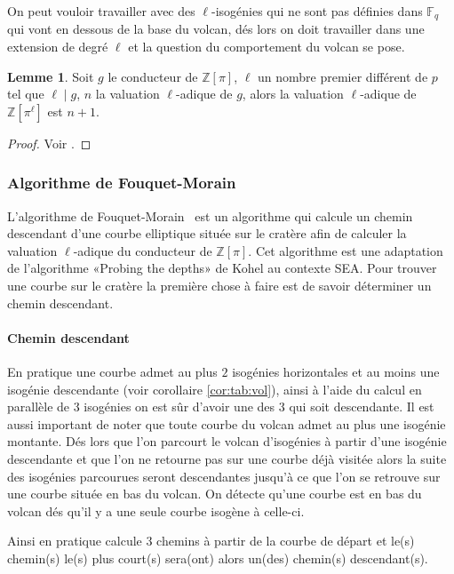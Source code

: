 \documentclass[10pt,a4paper]{book}
\theoremstyle{plain}
\theoremstyle{definition}
\theoremstyle{definition}
\newtheorem{lem}[thm]{Lemme}
\theoremstyle{definition}
\theoremstyle{definition}
\theoremstyle{definition}
\theoremstyle{remark}
\theoremstyle{remark}
\theoremstyle{definition}
\begin{document}
On peut vouloir travailler avec des $\ell$-isogénies qui ne sont pas définies dans $\mathbb{F}_q$ qui vont en dessous de la base du volcan, dés lors on doit travailler dans une extension de degré $\ell$ et la question du comportement du volcan se pose.

\begin{lem}
\label{lem:val:ext}
Soit $g$ le conducteur de $\mathbb{Z}[\pi]$, $\ell$ un nombre premier différent de $p$ tel que $\ell \mid g$, $n$ la valuation $\ell$-adique de $g$, alors la valuation $\ell$-adique de $\mathbb{Z}[\pi^{\ell}]$ est $n+1$. 
\end{lem}

\begin{proof}
Voir \cite[Proposition 6]{MiretMSTV08}.
\end{proof}

\subsubsection{Algorithme de Fouquet-Morain}
\label{sub:alg:FM}
L'algorithme de Fouquet-Morain~\cite{FouquetMorain02} est un algorithme qui 
calcule un chemin descendant d'une courbe elliptique située sur le cratère afin
de calculer la valuation $\ell$-adique du conducteur de $\mathbb{Z}[\pi]$. Cet
algorithme est une adaptation de l'algorithme «Probing the depths» de Kohel \cite[Section 4.2]{Kohel96} au contexte SEA. Pour trouver une courbe sur le cratère la première chose à faire est de savoir déterminer un chemin descendant. 

\paragraph{Chemin descendant}
En pratique une courbe admet au plus $2$ isogénies horizontales et au moins une isogénie descendante (voir corollaire \ref{cor:tab:vol}), ainsi à l'aide du calcul en parallèle de 3 isogénies on est sûr d'avoir une des 3 qui soit descendante. Il est aussi important de noter que toute courbe du volcan admet au plus une isogénie montante. Dés lors que l'on parcourt le volcan d'isogénies à partir d'une isogénie descendante et que l'on ne retourne pas sur une courbe déjà visitée alors la suite des isogénies parcourues seront descendantes jusqu'à ce que l'on se retrouve sur une courbe située en bas du volcan. On détecte qu'une courbe est en bas du volcan dés qu'il y a une seule courbe isogène à celle-ci.

Ainsi en pratique \cite{FouquetMorain02} calcule 3 chemins à partir de la courbe de départ et le(s) chemin(s) le(s) plus court(s) sera(ont) alors un(des) chemin(s) descendant(s). 
\end{document}
